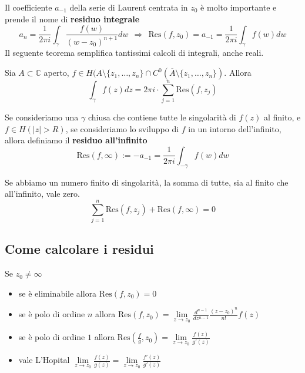 Il coefficiente $a_{-1}$ della serie di Laurent centrata in $z_{0}$ è molto importante e prende il nome di \textbf{residuo integrale}
\begin{equation*}
a_{n} =\frac{1}{2\pi i}\int _{\gamma }\frac{f( w)}{( w-z_{0})^{n+1}} dw\ \ \Rightarrow \ \ \mathrm{Res}( f,z_{0}) =a_{-1} =\frac{1}{2\pi i}\int _{\gamma } f( w) dw
\end{equation*}
Il seguente teorema semplifica tantissimi calcoli di integrali, anche reali.
\begin{theorem}
 Sia $A\subset \mathbb{C}$ aperto, $f\in H( A\setminus \{z_{1} ,\dotsc ,z_{n}\} \cap C^{0}(\overline{A} \setminus \{z_{1} ,\dotsc ,z_{n}\})$. Allora
\begin{equation*}
\boxed{\int _{\gamma } f( z) dz=2\pi i\cdotp \sum\limits ^{n}_{j=1}\mathrm{Res}( f,z_{j})}
\end{equation*}
\end{theorem}
\begin{definition}
Se consideriamo una $\gamma $ chiusa che contiene tutte le singolarità di $f( z)$ al finito, e $f\in H(| z|  >R)$, se consideriamo lo sviluppo di $f$ in un intorno dell'infinito, allora definiamo il \textbf{residuo all'infinito}
\begin{equation*}
\mathrm{Res}( f,\infty ) :=-a_{-1} =\frac{1}{2\pi i}\int _{-\gamma } f( w) dw
\end{equation*}
\end{definition}
\begin{theorem}
Se abbiamo un numero finito di singolarità, la somma di tutte, sia al finito che all'infinito, vale zero.
\begin{equation*}
\sum\limits ^{n}_{j=1}\mathrm{Res}( f,z_{j}) +\mathrm{Res}( f,\infty ) =0
\end{equation*}
\end{theorem}
\subsection{Come calcolare i residui}

Se $z_{0} \neq \infty $
\begin{itemize}
\item se è eliminabile allora $\mathrm{Res}( f,z_{0}) =0$
\item se è polo di ordine $n$ allora $\mathrm{Res}( f,z_{0}) =\lim\limits _{z\rightarrow z_{0}}\frac{d^{n-1}}{dz^{n-1}}\frac{( z-z_{0})^{n}}{n!} f( z)$
\item se è polo di ordine $1$ allora $\mathrm{Res}\left(\frac{f}{g} ,z_{0}\right) =\lim\limits _{z\rightarrow z_{0}}\frac{f( z)}{g'( z)}$
\item vale L'Hopital $\lim\limits _{z\rightarrow z_{0}}\frac{f(z)}{g(z)} =\lim\limits _{z\rightarrow z_{0}}\frac{f'(z)}{g'(z)}$
\end{itemize}

